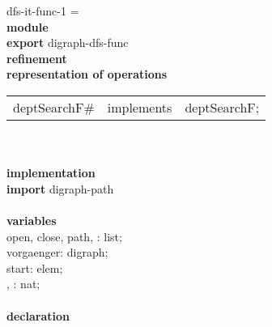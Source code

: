 \begin{tabbing}\label{dfs-it-func-1-module}%
dfs-it-func-1 = \\
{\bf mod}\={\bf ule}\+\\
{\bf export} digraph-dfs-func\\
{\bf ref}\={\bf inement}\+\\
{\bf rep}\= {\bf resentation of operations}\+\\
\begin{tabular}{lcl}
deptSearchF\# & implements & deptSearchF;
\end{tabular}\-\\

\\
{\bf implementation}\\
{\bf import} digraph-path\\
\\
{\bf vari}\={\bf ables}\+\\
open, close, path, : list;\\
vorgaenger: digraph;\\
start: elem;\\
, : nat;
\-\\
\\

               {\bf declaration}
\end{tabbing}

